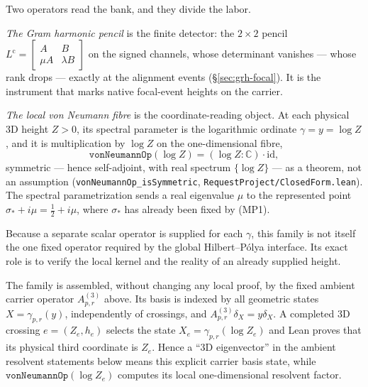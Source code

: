 \documentclass[11pt]{article}
\theoremstyle{definition}
\begin{document}
Two operators read the bank, and they divide the labor.

\emph{The Gram harmonic pencil} is the finite detector: the \(2\times2\)
pencil
\(L^{\mathrm c}=\left[\begin{smallmatrix}A&B\\ \mu A&\lambda
B\end{smallmatrix}\right]\)
on the signed channels, whose determinant vanishes --- whose rank drops ---
exactly at the alignment events (\S\ref{sec:grh-focal}). It is the instrument
that marks native focal-event heights on the carrier.

\emph{The local von Neumann fibre} is the coordinate-reading object. At each
physical 3D height \(Z>0\), its spectral parameter is the logarithmic ordinate
\(\gamma=y=\log Z\), and it is multiplication by \(\log Z\) on the
one-dimensional fibre,
\[
\texttt{vonNeumannOp}(\log Z)=(\log Z:\mathbb C)\cdot\mathrm{id},
\]
symmetric --- hence self-adjoint, with real spectrum \(\{\log Z\}\) --- as a
theorem, not an assumption (\texttt{vonNeumannOp\_isSymmetric},
\texttt{RequestProject/ClosedForm.lean}). The spectral parametrization sends
a real eigenvalue \(\mu\) to the represented point
\(\sigma_*+i\mu=\tfrac12+i\mu\), where \(\sigma_*\) has already been fixed
by (MP1).

Because a separate scalar operator is supplied for each \(\gamma\), this family is
not itself the one fixed operator required by the global Hilbert--P\'olya
interface.  Its exact role is to verify the local kernel and the reality of an
already supplied height.

The family is assembled, without changing any local proof, by the fixed
ambient carrier operator \(A^{(3)}_{p,r}\) above.  Its basis is indexed by all
geometric states $X=\gamma_{p,r}(y)$, independently of crossings, and
\(A^{(3)}_{p,r}\delta_X=y\delta_X\).  A completed 3D crossing
$e=(Z_e,h_e)$ selects the state $X_e=\gamma_{p,r}(\log Z_e)$ and Lean proves
that its physical third coordinate is $Z_e$.  Hence a ``3D eigenvector'' in
the ambient resolvent statements below means this explicit carrier basis state, while
\(\texttt{vonNeumannOp}(\log Z_e)\) computes its local
one-dimensional resolvent factor.
\end{document}
